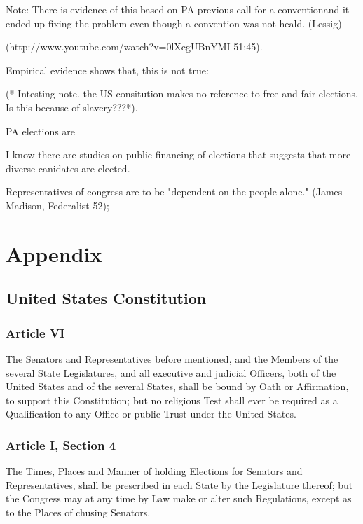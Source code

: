 \documentclass[11pt]{article} %
\begin{document}
\begin{enumerate}
Note:  There is evidence of this based on PA previous call for a conventionand it ended up fixing the problem even though a convention was not heald. (Lessig)


(http://www.youtube.com/watch?v=0lXcgUBnYMI   51:45).



Empirical evidence shows that, this is not true:  

(* Intesting note.  the US consitution makes no reference to free and fair elections. Is this because of slavery???*). 

PA elections are 

I know there are studies on public financing of elections that suggests that more diverse canidates are elected. 

Representatives of congress are to be "dependent on the people alone." (James Madison, Federalist 52); 

\section{Appendix}
\subsection{United States Constitution}

\subsubsection{Article VI}
\label{sec:ArticleVIUS}
The Senators and Representatives before mentioned, and the Members of the several State Legislatures, and all executive and judicial Officers, both of the United States and of the several States, shall be bound by Oath or Affirmation, to support this Constitution; but no religious Test shall ever be required as a Qualification to any Office or public Trust under the United States.

\subsubsection{Article I, Section 4}
\label{sec:ArticleISection4US}
The Times, Places and Manner of holding Elections for Senators and Representatives, shall be prescribed in each State by the Legislature thereof; but the Congress may at any time by Law make or alter such Regulations, except as to the Places of chusing Senators. 


\end{enumerate}
\end{document}
